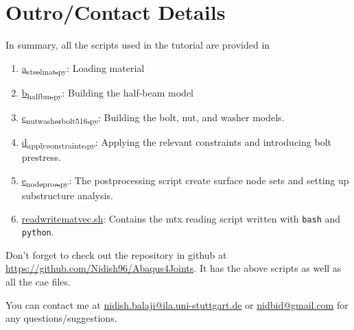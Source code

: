 \documentclass[11pt]{article}
\begin{document}
\section{Outro/Contact Details}
\label{sec:org7c956ab}
In summary, all the scripts used in the tutorial are provided in 
\begin{enumerate}
\item \href{https://github.com/Nidish96/Abaqus4Joints/blob/main/scripts/a\_steelmat.py}{a\textsubscript{steelmat.py}}: Loading material
\item \href{https://github.com/Nidish96/Abaqus4Joints/blob/main/scripts/b\_halfbm.py}{b\textsubscript{halfbm.py}}: Building the half-beam model
\item \href{https://github.com/Nidish96/Abaqus4Joints/blob/main/scripts/c\_nutwasherbolt\_516.py}{c\textsubscript{nutwasherbolt}\textsubscript{516.py}}: Building the bolt, nut, and washer models.
\item \href{https://github.com/Nidish96/Abaqus4Joints/blob/main/scripts/d\_applyconstraints.py}{d\textsubscript{applyconstraints.py}}: Applying the relevant constraints and introducing bolt prestress.
\item \href{https://github.com/Nidish96/Abaqus4Joints/blob/main/scripts/e\_nodeproc.py}{e\textsubscript{nodeproc.py}}: The postprocessing script create surface node sets and setting up substructure analysis.
\item \href{https://github.com/Nidish96/Abaqus4Joints/blob/main/scripts/readwritematvec.sh}{readwritematvec.sh}: Contains the mtx reading script written with \texttt{bash} and \texttt{python}.
\end{enumerate}

Don't forget to check out the repository in github at \href{https://github.com/Nidish96/Abaqus4Joints/blob/main/assets/assembly/model\_step3.cae}{https://github.com/Nidish96/Abaqus4Joints}.
It has the above scripts as well as all the cae files.

You can contact me at \href{mailto:nidish.balaji@ila.uni-stuttgart.de}{nidish.balaji@ila.uni-stuttgart.de} or \href{mailto:nidbid@gmail.com}{nidbid@gmail.com} for any questions/suggestions.
\end{document}
